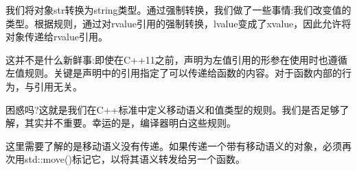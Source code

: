 我们将对象str转换为string类型。通过强制转换，我们做了一些事情:我们改变值的类型。根据规则，通过对rvalue引用的强制转换，lvalue变成了xvalue，因此允许将对象传递给rvalue引用。\par

这并不是什么新鲜事:即使在C++11之前，声明为左值引用的形参在使用时也遵循左值规则。关键是声明中的引用指定了可以传递给函数的内容。对于函数内部的行为，与引用无关。\par

困惑吗?这就是我们在C++标准中定义移动语义和值类型的规则。我们是否足够了解，其实并不重要。幸运的是，编译器明白这些规则。\par

这里需要了解的是移动语义没有传递。如果传递一个带有移动语义的对象，必须再次用std::move()标记它，以将其语义转发给另一个函数。\par











































